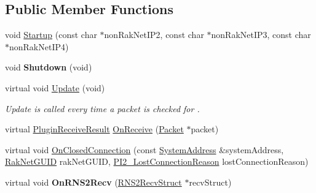 \subsection*{Public Member Functions}
\begin{DoxyCompactItemize}
\item 
void \hyperlink{class_rak_net_1_1_nat_type_detection_server_a7f98c268bfa2c0762a577679e753f31a}{Startup} (const char $\ast$non\-Rak\-Net\-I\-P2, const char $\ast$non\-Rak\-Net\-I\-P3, const char $\ast$non\-Rak\-Net\-I\-P4)
\item 
\hypertarget{class_rak_net_1_1_nat_type_detection_server_a724e26f61621af8b741345610112474c}{void {\bfseries Shutdown} (void)}\label{class_rak_net_1_1_nat_type_detection_server_a724e26f61621af8b741345610112474c}

\item 
\hypertarget{class_rak_net_1_1_nat_type_detection_server_a7df6c37944e93fac0f440666ee619cef}{virtual void \hyperlink{class_rak_net_1_1_nat_type_detection_server_a7df6c37944e93fac0f440666ee619cef}{Update} (void)}\label{class_rak_net_1_1_nat_type_detection_server_a7df6c37944e93fac0f440666ee619cef}

\begin{DoxyCompactList}\small\item\em Update is called every time a packet is checked for . \end{DoxyCompactList}\item 
virtual \hyperlink{group___p_l_u_g_i_n___i_n_t_e_r_f_a_c_e___g_r_o_u_p_ga89998adaafb29e5d879113b992161085}{Plugin\-Receive\-Result} \hyperlink{class_rak_net_1_1_nat_type_detection_server_a3e57afed0cc9d4db4834c6ddb07c834c}{On\-Receive} (\hyperlink{struct_rak_net_1_1_packet}{Packet} $\ast$packet)
\item 
virtual void \hyperlink{class_rak_net_1_1_nat_type_detection_server_a98f60d8ef3b1542dff0c81464fb0cad8}{On\-Closed\-Connection} (const \hyperlink{struct_rak_net_1_1_system_address}{System\-Address} \&system\-Address, \hyperlink{struct_rak_net_1_1_rak_net_g_u_i_d}{Rak\-Net\-G\-U\-I\-D} rak\-Net\-G\-U\-I\-D, \hyperlink{group___p_l_u_g_i_n___i_n_t_e_r_f_a_c_e___g_r_o_u_p_ga376cc546fd6892c2ead48cd51796c8b8}{P\-I2\-\_\-\-Lost\-Connection\-Reason} lost\-Connection\-Reason)
\item 
\hypertarget{class_rak_net_1_1_nat_type_detection_server_ad8b6833fe13629dd6154ca87cfccd379}{virtual void {\bfseries On\-R\-N\-S2\-Recv} (\hyperlink{struct_rak_net_1_1_r_n_s2_recv_struct}{R\-N\-S2\-Recv\-Struct} $\ast$recv\-Struct)}\label{class_rak_net_1_1_nat_type_detection_server_ad8b6833fe13629dd6154ca87cfccd379}


\end{DoxyCompactItemize}
